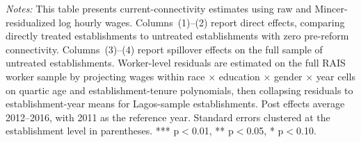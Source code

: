 \documentclass[11pt]{article}
\begin{document}
\begin{table}[H]
\begin{tabular}{lcccc}
\end{tabular}
\begin{minipage}{\linewidth}
    \scriptsize\vspace{4pt}
\textit{Notes:} This table presents current-connectivity estimates using raw and Mincer-residualized log hourly wages. Columns~(1)--(2) report direct effects, comparing directly treated establishments to untreated establishments with zero pre-reform connectivity. Columns~(3)--(4) report spillover effects on the full sample of untreated establishments. Worker-level residuals are estimated on the full RAIS worker sample by projecting wages within race $\times$ education $\times$ gender $\times$ year cells on quartic age and establishment-tenure polynomials, then collapsing residuals to establishment-year means for Lagos-sample establishments. Post effects average 2012--2016, with 2011 as the reference year. Standard errors clustered at the establishment level in parentheses. *** p$<$0.01, ** p$<$0.05, * p$<$0.10.
\end{minipage}
\end{table}
\end{document}

